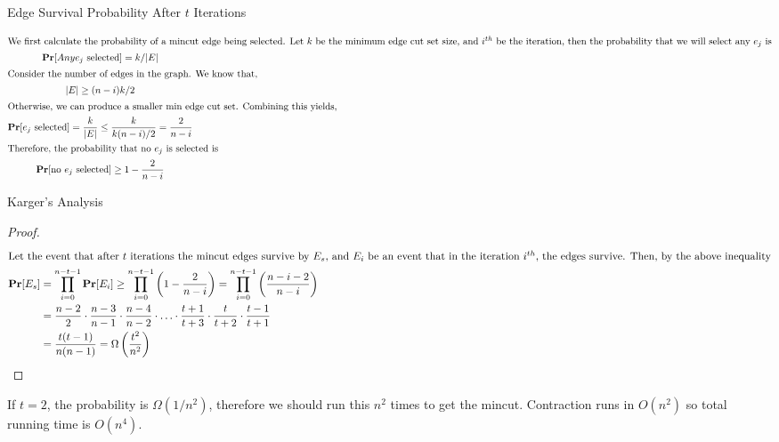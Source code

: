 \begin{frame}{Edge Survival Probability After $t$ Iterations}
    \setlength{\abovedisplayskip}{4pt}
    \setlength{\belowdisplayskip}{4pt}
    \setlength{\abovedisplayshortskip}{4pt}
    \setlength{\belowdisplayshortskip}{4pt}
    \begin{proofs}
        \begin{gather*}
            \intertext{We first calculate the probability of a mincut edge being selected. Let $k$ be the minimum edge cut set size, and $i^{th}$ be the iteration, then the probability that we will select any $e_j$ is}
            \textbf{Pr}[Any \text{$e_j$ selected}] = k/|E|\\
            \intertext{Consider the number of edges in the graph. We know that,}
            |E| \geq (n - i)k/2\\
            \intertext{Otherwise, we can produce a smaller min edge cut set. Combining this yields,}
            \textbf{Pr}[\text{$e_j$ selected}] = \frac{k}{|E|} \leq \frac{k}{k(n - i)/2} = \frac{2}{n - i}\\
            \intertext{Therefore, the probability that no $e_j$ is selected is}
            \textbf{Pr}[\text{no $e_j$ selected}] \geq 1 - \frac{2}{n - i}
        \end{gather*}
    \end{proofs}
\end{frame}

\begin{frame}[fragile]{Karger's Analysis}
    \setlength{\abovedisplayskip}{5pt}
    \setlength{\belowdisplayskip}{5pt}
    \setlength{\abovedisplayshortskip}{5pt}
    \setlength{\belowdisplayshortskip}{5pt}
    \begin{proof}
        \begin{align*}
        \intertext{Let the event that after $t$ iterations the mincut edges survive by $E_s$, and $E_i$ be an event that in the iteration $i^{th}$, the edges survive. Then, by the above inequality}
        \textbf{Pr}[E_s] &= \prod_{i = 0}^{n - t - 1}\textbf{Pr}[E_i]\geq \prod_{i = 0}^{n - t - 1}\left(1 - \frac{2}{n - i}\right) = \prod_{i = 0}^{n - t - 1}\left(\frac{n - i - 2}{n - i}\right)\\
        &= \frac{n -2}{2} \cdot \frac{n - 3}{n -1} \cdot \frac{n -4}{n - 2} \cdot \hdots \cdot \frac{t + 1}{t + 3} \cdot \frac{t}{t + 2} \cdot \frac{t - 1}{t + 1}\\
        &= \frac{t(t - 1)}{n(n - 1)} = \Omega\left(\frac{t^2}{n^2}\right)
    \end{align*}
    \end{proof}
    If $t = 2$, the probability is $\Omega(1/n^2)$, therefore we should run this $n^2$ times to get the mincut. Contraction runs in $O(n^2)$ so total running time is $O(n^4)$.
\end{frame}

